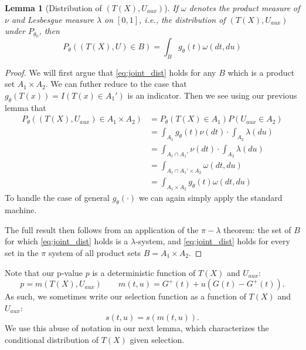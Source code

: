 \documentclass{article}
\newtheorem{lemma}{Lemma}
\begin{document}
\begin{appendix}
\begin{lemma}[Distribution of $(T(X), U_{aux})$]
    \label{lem:pi_lambda}
    If $\omega$ denotes the product measure of $\nu$ and Lesbesgue measure $\lambda$ on $[0, 1]$, i.e., the distribution of $(T(X), U_{aux})$ under $P_{\theta_0}$, then 
    \begin{equation}
    \label{eq:joint_dist}
        P_{\theta}((T(X), U) \in B) = \int_{B} g_{\theta}(t) \omega(dt, du)
    \end{equation}
\end{lemma}

\begin{proof}
    We will first argue that \eqref{eq:joint_dist} holds for any $B$ which is a product set $A_1 \times A_2$. We can futher reduce to the case that $g_{\theta}(T(x)) = I(T(x) \in A_1')$ is an indicator. Then we see using our previous lemma that 
    \begin{align*}
        P_{\theta}((T(X), U_{aux}) \in A_1 \times A_2) &= P_{\theta}(T(X) \in A_1)P(U_{aux} \in A_2)\\
                                          &= \int_{A_1} g_{\theta}(t) \nu(dt) \cdot \int_{A_2} \lambda(du)\\
                                          &= \int_{A_1 \cap A_1'} \nu(dt) \cdot \int_{A_2} \lambda(du)\\
                                          &= \int_{A_1 \cap A_1' \times A_2} \omega(dt, du)\\
                                          &= \int_{A_1 \times A_2} g_{\theta}(t)\omega(dt, du)
    \end{align*}
    To handle the case of general $g_{\theta}(\cdot)$ we can again simply apply the standard machine. 
    
    The full result then follows from an application of the $\pi-\lambda$ theorem: the set of $B$ for which \eqref{eq:joint_dist} holds is a $\lambda$-system, and \eqref{eq:joint_dist} holds for every set in the $\pi$ system of all product sets $B = A_1 \times A_2$. 
\end{proof}

Note that our p-value $p$ is a deterministic function of $T(X)$ and $U_{aux}$:
\begin{equation*}
    p = m(T(X), U_{aux}) \qquad m(t, u) = G^+(t) + u(G(t) - G^+(t)).
\end{equation*}
As such, we sometimes write our selection function as a function of $T(X)$ and $U_{aux}$:
\begin{equation*}
    s(t, u) = s(m(t, u)). 
\end{equation*}
We use this abuse of notation in our next lemma, which characterizes the conditional distribution of $T(X)$ given selection.


\end{appendix}
\end{document}

